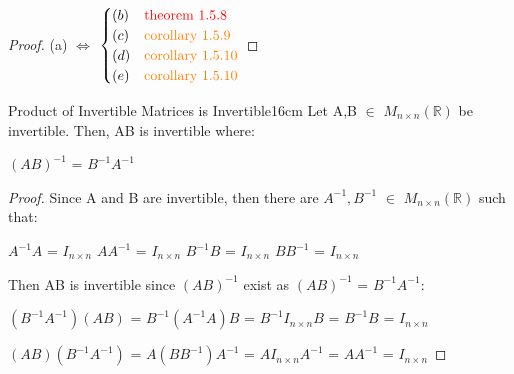     \begin{proof}
        (a) $\Leftrightarrow$
        $\begin{cases}
            (b) & {\color{red} \text{theorem 1.5.8}} \\
            (c) & {\color{orange} \text{corollary 1.5.9}} \\
            (d) & {\color{orange} \text{corollary 1.5.10}} \\
            (e) & {\color{orange} \text{corollary 1.5.10}}
        \end{cases}$
    \end{proof}

    \vspace{0.5cm}



    \begin{wtheorem}{Product of Invertible Matrices is Invertible}{16cm}
        Let A,B $\in$ $M_{n \times n}(\mathbb{R})$ be invertible.
        Then, AB is invertible where:

        \hspace{0.5cm}
        $(AB)^{-1}$ = $B^{-1}A^{-1}$
    \end{wtheorem}

    \begin{proof}
        Since A and B are invertible, then there are
        $A^{-1},B^{-1}$ $\in$ $M_{n \times n}(\mathbb{R})$ such that:

        \hspace{0.5cm}
        $A^{-1}A$ = $I_{n \times n}$
        \hspace{1cm}
        $AA^{-1}$ = $I_{n \times n}$
        \hspace{2cm}
        $B^{-1}B$ = $I_{n \times n}$
        \hspace{1cm}
        $BB^{-1}$ = $I_{n \times n}$

        Then AB is invertible since $(AB)^{-1}$ exist
        as $(AB)^{-1}$ = $B^{-1}A^{-1}$:

        \hspace{0.5cm}
        $(B^{-1}A^{-1})(AB)$
        = $B^{-1}(A^{-1}A)B$
        = $B^{-1}I_{n \times n}B$
        = $B^{-1}B$
        = $I_{n \times n}$

        \hspace{0.5cm}
        $(AB)(B^{-1}A^{-1})$
        = $A(BB^{-1})A^{-1}$
        = $AI_{n \times n}A^{-1}$
        = $AA^{-1}$
        = $I_{n \times n}$
    \end{proof}

